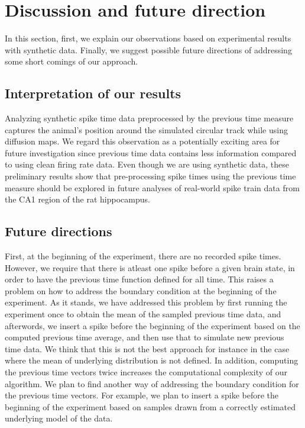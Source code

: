 \section{Discussion and future direction}
In this section, first, we explain our observations based on experimental results with synthetic data.  Finally, we suggest possible future directions of addressing some short comings of our approach.


\subsection{Interpretation of our results}
Analyzing synthetic spike time data preprocessed by the previous time measure captures the animal's position around the simulated circular track while using diffusion maps. We regard this observation as a potentially exciting area for future investigation since previous time data contains less information compared to using clean firing rate data. Even though we are using  synthetic data, these preliminary results show that pre-processing spike times using the previous time  measure should be explored in future analyses of real-world spike train data from the CA1 region of the rat hippocampus. 

\subsection{Future directions}
First, at the beginning of the experiment, there are no recorded spike times.
However, we require that there is atleast one spike before a given brain state, in order to have the previous time function defined for all time. This raises a problem on how to address the boundary condition at the beginning
of the experiment. As it stands, we have addressed this problem by first running the experiment once to obtain the mean of the sampled previous time data, and afterwords, we insert a spike before the beginning of the experiment based on the computed previous time average, and then use that to simulate new  previous time data. We think that this is not the best approach for instance in the case where the mean of underlying distribution is not defined. In addition, computing the previous time vectors twice increases the computational complexity of our algorithm. We plan to find another way of addressing the boundary condition for the previous time vectors. For example, we plan to insert a spike before the beginning of the experiment based on samples drawn from a correctly estimated underlying model of the data.\\

